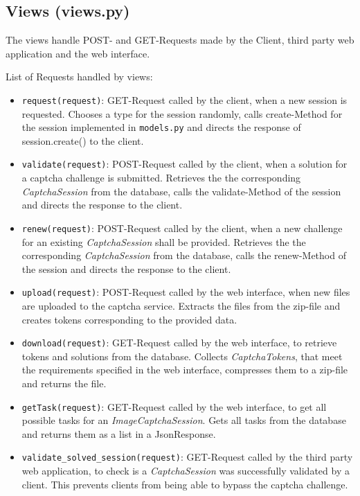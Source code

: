 \subsection{Views (views.py)}

The views handle POST- and GET-Requests made by the Client, third party web application and the web interface. 

List of Requests handled by views:

\begin{itemize}
\item \verb|request(request)|: GET-Request called by the client, when a new session is requested. Chooses a type for the session randomly, calls create-Method for the session implemented in \verb|models.py| and directs the response of session.create() to the client.
\item \verb|validate(request)|: POST-Request called by the client, when a solution for a captcha challenge is submitted. Retrieves the the corresponding \emph{CaptchaSession} from the database, calls the validate-Method of the session and directs the response to the client.
\item \verb|renew(request)|: POST-Request called by the client, when a new challenge for an existing \emph{CaptchaSession} shall be provided. Retrieves the the corresponding \emph{CaptchaSession} from the database, calls the renew-Method of the session and directs the response to the client.
\item \verb|upload(request)|: POST-Request called by the web interface, when new files are uploaded to the captcha service. Extracts the files from the zip-file and creates tokens corresponding to the provided data.
\item \verb|download(request)|: GET-Request called by the web interface, to retrieve tokens and solutions from the database. Collects \emph{CaptchaTokens}, that meet the requirements specified in the web interface, compresses them to a zip-file and returns the file.
\item \verb|getTask(request)|: GET-Request called by the web interface, to get all possible tasks for an \emph{ImageCaptchaSession}. Gets all tasks from the database and returns them as a list in a JsonResponse.
\item \verb|validate_solved_session(request)|: GET-Request called by the third party web application, to check is a \emph{CaptchaSession} was successfully validated by a client. This prevents clients from being able to bypass the captcha challenge.
\end{itemize}


\clearpage


